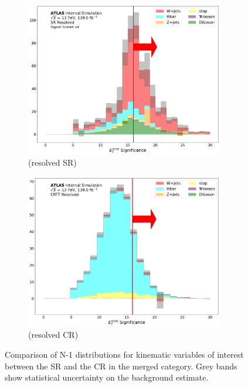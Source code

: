 \begin{figure}[htbp]
  \begin{subfigure}{0.45\textwidth}
     \includegraphics[width = 0.95\textwidth]{Figures/App_SR_CR_distributions/SR1L_Resolved/MetTST_Significance_N_1.pdf}
    \caption{\metsig (resolved SR)}
     \end{subfigure}
    \begin{subfigure}{0.45\textwidth}
     \includegraphics[width = 0.95\textwidth]{Figures/App_SR_CR_distributions/CRTT_Resolved/MetTST_Significance_N_1.pdf}
     \caption{\metsig (resolved \ttbar CR)}
     \end{subfigure}
     \caption{Comparison of N-1 distributions for kinematic variables of interest between the SR and the \ttbar CR in the merged category. Grey bands show statistical uncertainty on the background estimate.}
     \label{fig:N_1_CRTT_resolved}
     \end{figure}

